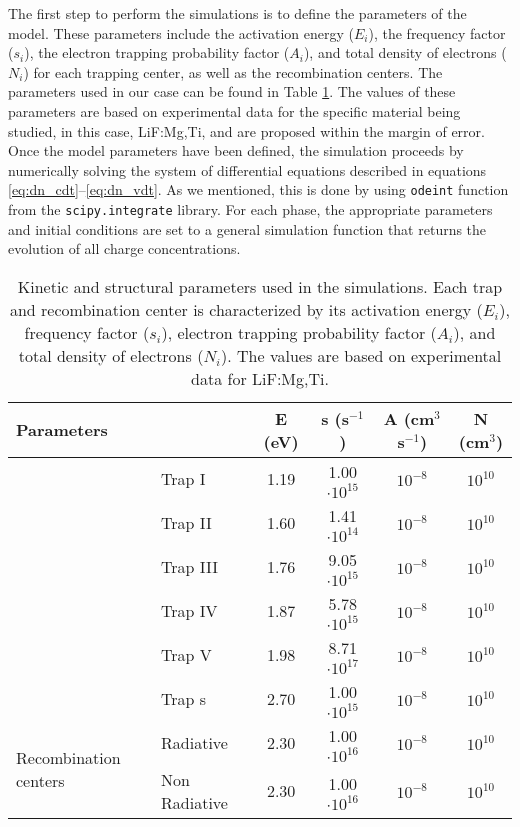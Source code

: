 \vspace{10pt}

The first step to perform the simulations is to define the parameters of the model. These parameters include the activation energy ($E_i$), the frequency factor ($s_i$), the electron trapping probability factor ($A_i$), and total density of electrons ($N_i$) for each trapping center, as well as the recombination centers. The parameters used in our case can be found in Table \ref{tab:simulationparameters}. The values of these parameters are based on experimental data \cite{benavente_LiF} for the specific material being studied, in this case, LiF:Mg,Ti, and are proposed within the margin of error. Once the model parameters have been defined, the simulation proceeds by numerically solving the system of differential equations described in equations \ref{eq:dn_cdt}--\ref{eq:dn_vdt}. As we mentioned, this is done by using \texttt{odeint} function from the \texttt{scipy.integrate} library. For each phase, the appropriate parameters and initial conditions are set to a general simulation function that returns the evolution of all charge concentrations. 


\renewcommand{\arraystretch}{1.5}
\begin{longtable}[c]{llcccc}
\caption{Kinetic and structural parameters used in the simulations. Each trap and recombination center is characterized by its activation energy ($E_i$), frequency factor ($s_i$), electron trapping probability factor ($A_i$), and total density of electrons ($N_i$). The values are based on experimental data for LiF:Mg,Ti.}
\label{tab:simulationparameters}\\
\hline
\multicolumn{2}{l}{Parameters} & \multicolumn{1}{c}{E (eV)} & \multicolumn{1}{c}{s (s$^{-1}$)} & \multicolumn{1}{c}{A (cm$^3$ s$^{-1}$)} & \multicolumn{1}{c}{N (cm$^3$)} \\ \hline
\endhead
%
\hline
\endfoot
%
\endlastfoot
%
\multirow{6}{*}{Trapping Centers}      & Trap I        & 1.19   & 1.00 $\cdot 10^{15}$ &  $10^{-8}$ &  $10^{10}$ \\
                                       & Trap II       & 1.60   & 1.41 $\cdot 10^{14}$ &  $10^{-8}$ &  $10^{10}$ \\
                                       & Trap III      & 1.76   & 9.05 $\cdot 10^{15}$ &  $10^{-8}$ &  $10^{10}$ \\
                                       & Trap IV       & 1.87   & 5.78 $\cdot 10^{15}$ &  $10^{-8}$ &  $10^{10}$ \\
                                       & Trap V        & 1.98   & 8.71 $\cdot 10^{17}$ &  $10^{-8}$ &  $10^{10}$ \\
                                       & Trap s        & 2.70   & 1.00 $\cdot 10^{15}$ &  $10^{-8}$ &  $10^{10}$ \\ \hline
\multirow{2}{*}{Recombination centers} & Radiative     & 2.30   & 1.00 $\cdot 10^{16}$ &  $10^{-8}$ &  $10^{10}$ \\
                                       & Non Radiative & 2.30   & 1.00 $\cdot 10^{16}$ &  $10^{-8}$ &  $10^{10}$ \\ \hline
\end{longtable}

